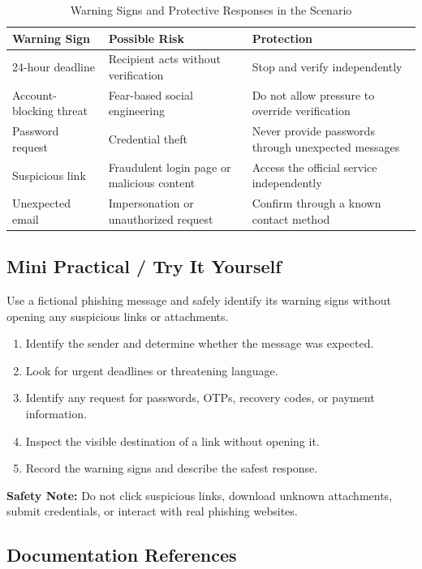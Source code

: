 \documentclass[12pt,a4paper]{article}
\begin{document}
\begin{table}[H]
\centering\small
\begin{tabularx}{\textwidth}{|p{3.1cm}|X|X|}
\hline
\textbf{Warning Sign} & \textbf{Possible Risk} & \textbf{Protection}\\\hline
24-hour deadline & Recipient acts without verification & Stop and verify independently\\\hline
Account-blocking threat & Fear-based social engineering & Do not allow pressure to override verification\\\hline
Password request & Credential theft & Never provide passwords through unexpected messages\\\hline
Suspicious link & Fraudulent login page or malicious content & Access the official service independently\\\hline
Unexpected email & Impersonation or unauthorized request & Confirm through a known contact method\\\hline
\end{tabularx}
\caption{Warning Signs and Protective Responses in the Scenario}
\end{table}

\subsection{Mini Practical / Try It Yourself}

Use a fictional phishing message and safely identify its warning signs without opening any suspicious links or attachments.

\begin{enumerate}
    \item Identify the sender and determine whether the message was expected.
    \item Look for urgent deadlines or threatening language.
    \item Identify any request for passwords, OTPs, recovery codes, or payment information.
    \item Inspect the visible destination of a link without opening it.
    \item Record the warning signs and describe the safest response.
\end{enumerate}

\textbf{Safety Note:} Do not click suspicious links, download unknown attachments, submit credentials, or interact with real phishing websites.

\subsection{Documentation References}
\end{document}
